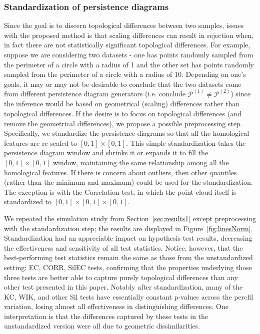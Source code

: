 \documentclass[12pt]{article}
\newcommand{\figref}[1]{Figure~\ref{#1}}
\begin{document}
\subsubsection{Standardization of persistence diagrams} \label{sec:standardize}
Since the goal is to discern topological differences between two samples, issues with the proposed method is that scaling differences can result in rejection when, in fact there are not statistically significant topological differences. For example, suppose we are considering two datasets - one has points randomly sampled from the perimeter of a circle with a radius of 1 and the other set has points randomly sampled from the perimeter of a circle with a radius of 10.  Depending on one's goals, it may or may not be desirable to conclude that the two datasets come from different persistence diagram generators (i.e. conclude $\mathcal P^{(1)} \neq \mathcal P^{(2)}$) since the inference would be based on geometrical (scaling) differences rather than topological differences.  If the desire is to focus on topological differences (and remove the geometrical differences), we propose a possible preprocessing step. Specifically, we standardize the persistence diagrams so that all the homological features are re-scaled to $[0, 1]\times[0,1]$. This simple standardization takes the persistence diagram window and shrinks it or expands it to fill the $[0, 1]\times[0,1]$ window, maintaining the same relationship among all the homological features.  If there is concern about outliers, then other quantiles (rather than the minimum and maximum) could be used for the standardization. The exception is with the Correlation test, in which the point cloud itself is standardized to $[0, 1]\times[0, 1]\times[0, 1]$.

We repeated the simulation study from Section~\ref{sec:results1} except preprocessing with the standardization step; the results are displayed in \figref{fig:linesNorm}. Standardization had an appreciable impact on hypothesis test results, decreasing the effectiveness and sensitivity of all test statistics. Notice, however, that the best-performing test statistics remain the same as those from the unstandardized setting: EC, CORR, SilEC tests, confirming that the properties underlying those three tests are better able to capture purely topological differences than any other test presented in this paper. Notably after standardization, many of the KC, WIK, and other Sil tests have essentially constant p-values across the percfil variation, losing almost all effectiveness in distinguishing differences. One interpretation is that the differences captured by these tests in the unstandardized version were all due to geometric dissimilarities.
\end{document}
